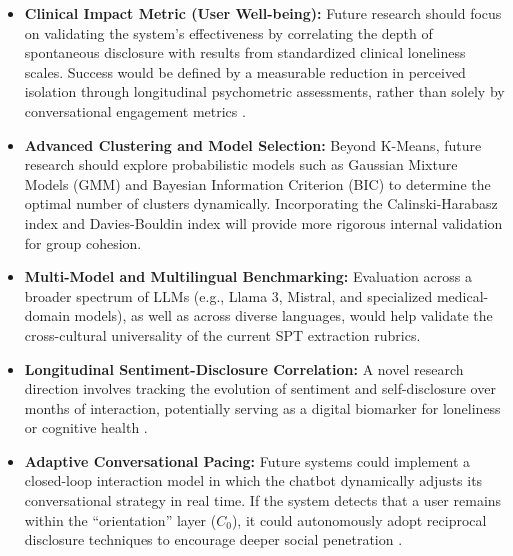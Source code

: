 \begin{itemize}
    \item \textbf{Clinical Impact Metric (User Well-being):} Future research should focus on validating the system’s effectiveness by correlating the depth of spontaneous disclosure with results from standardized clinical loneliness scales. Success would be defined by a measurable reduction in perceived isolation through longitudinal psychometric assessments, rather than solely by conversational engagement metrics \cite{Fox2021}.
    \item \textbf{Advanced Clustering and Model Selection:} Beyond K-Means, future research should explore probabilistic models such as Gaussian Mixture Models (GMM) and Bayesian Information Criterion (BIC) to determine the optimal number of clusters dynamically. Incorporating the Calinski-Harabasz index and Davies-Bouldin index will provide more rigorous internal validation for group cohesion.
    \item \textbf{Multi-Model and Multilingual Benchmarking:} Evaluation across a broader spectrum of LLMs (e.g., Llama 3, Mistral, and specialized medical-domain models), as well as across diverse languages, would help validate the cross-cultural universality of the current SPT extraction rubrics.
    \item \textbf{Longitudinal Sentiment-Disclosure Correlation:} A novel research direction involves tracking the evolution of sentiment and self-disclosure over months of interaction, potentially serving as a digital biomarker for loneliness or cognitive health \cite{Skjuve2023}.
    \item \textbf{Adaptive Conversational Pacing:} Future systems could implement a closed-loop interaction model in which the chatbot dynamically adjusts its conversational strategy in real time. If the system detects that a user remains within the “orientation” layer ($C_0$), it could autonomously adopt reciprocal disclosure \cite{Lee2017} techniques to encourage deeper social penetration \cite{Krsek2026}.
\end{itemize}